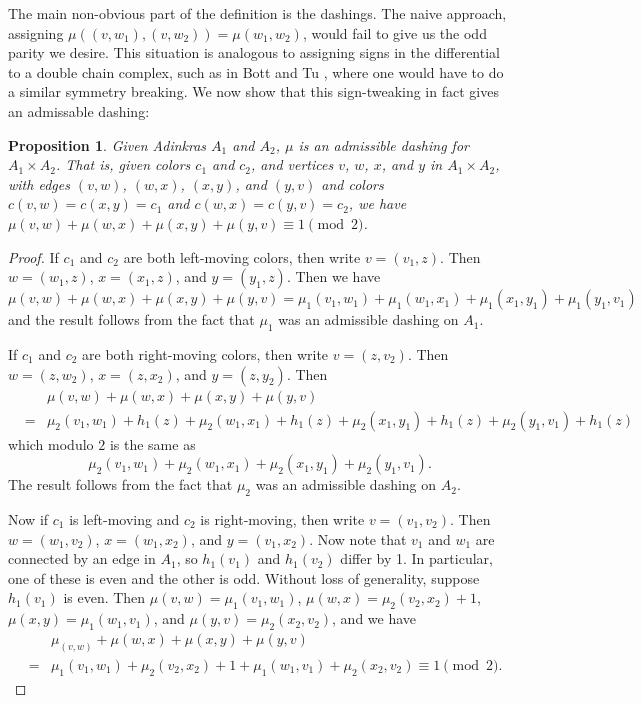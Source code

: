 \documentclass[12pt,twoside,singlespace]{article}
\numberwithin{equation}{section}
\newtheorem{prop}[equation]{Proposition}
\theoremstyle{definition}
\begin{document}
The main non-obvious part of the definition is the dashings. The naive approach, assigning $\mu((v,w_1), (v,w_2)) = \mu(w_1, w_2)$, would fail to give us the odd parity we desire. This situation is analogous to assigning signs in the differential to a double chain complex, such as in Bott and Tu \cite{bott_tu}, where one would have to do a similar symmetry breaking. We now show that this sign-tweaking in fact gives an admissable dashing:

\begin{prop}
\label{prop:product-admissable}
Given Adinkras $A_1$ and $A_2$, $\mu$ is an admissible dashing for $A_1\times A_2$.  That is, given colors $c_1$ and $c_2$, and vertices $v$, $w$, $x$, and $y$ in $A_1\times A_2$, with edges $(v,w)$, $(w,x)$, $(x,y)$, and $(y,v)$ and colors $c(v,w)=c(x,y)=c_1$ and $c(w,x)=c(y,v)=c_2$, we have $\mu(v,w)+\mu(w,x)+\mu(x,y)+\mu(y,v)\equiv 1 \pmod{2}$.
\end{prop}
\begin{proof}
If $c_1$ and $c_2$ are both left-moving colors, then write $v=(v_1,z)$.  Then $w=(w_1,z)$, $x=(x_1,z)$, and $y=(y_1,z)$.  Then we have
\[\mu(v,w)+\mu(w,x)+\mu(x,y)+\mu(y,v)
= \mu_1(v_1,w_1)+\mu_1(w_1,x_1)+\mu_1(x_1,y_1)+\mu_1(y_1,v_1)\]
and the result follows from the fact that $\mu_1$ was an admissible dashing on $A_1$.

If $c_1$ and $c_2$ are both right-moving colors, then write $v=(z,v_2)$.  Then $w=(z,w_2)$, $x=(z,x_2)$, and $y=(z,y_2)$.  Then
\begin{eqnarray*}
&&\mu(v,w)+\mu(w,x)+\mu(x,y)+\mu(y,v)\\
&=& \mu_2(v_1,w_1)+h_1(z)+\mu_2(w_1,x_1)+h_1(z)+\mu_2(x_1,y_1)+h_1(z)+\mu_2(y_1,v_1)+h_1(z)
\end{eqnarray*}
which modulo $2$ is the same as 
\[\mu_2(v_1,w_1)+\mu_2(w_1,x_1)+\mu_2(x_1,y_1)+\mu_2(y_1,v_1).\]
The result follows from the fact that $\mu_2$ was an admissible dashing on $A_2$.


Now if $c_1$ is left-moving and $c_2$ is right-moving, then write $v=(v_1,v_2)$.  Then $w=(w_1,v_2)$, $x=(w_1,x_2)$, and $y=(v_1,x_2)$.  Now note that $v_1$ and $w_1$ are connected by an edge in $A_1$, so $h_1(v_1)$ and $h_1(v_2)$ differ by 1.  In particular, one of these is even and the other is odd.  Without loss of generality, suppose $h_1(v_1)$ is even.  Then $\mu(v,w)=\mu_1(v_1,w_1)$, $\mu(w,x)=\mu_2(v_2,x_2)+1$, $\mu(x,y)=\mu_1(w_1,v_1)$, and $\mu(y,v)=\mu_2(x_2,v_2)$, and we have
\begin{eqnarray*}
&&\mu_(v,w)+\mu(w,x)+\mu(x,y)+\mu(y,v)\\
&=&\mu_1(v_1,w_1)+\mu_2(v_2,x_2)+1+\mu_1(w_1,v_1)+\mu_2(x_2,v_2)\equiv 1\pmod{2}.
\end{eqnarray*}
\end{proof}
\end{document}
